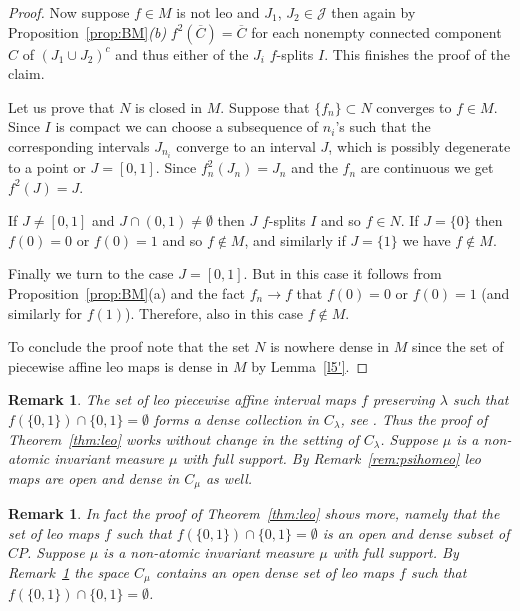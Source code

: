 \documentclass[12pt, a4paper]{amsart}
\newtheorem{remark}[theorem]{Remark}
\def\J{{\mathcal J}}
\newcommand{\?}{{\bf ???}}
\begin{document}
\begin{proof}
 Now suppose $f \in M$ is not leo and $J_1$, $J_2 \in \J$  then again by 
Proposition~\ref{prop:BM}{\it (b)}
$f^2(\overline{C}) = \overline{C}$ for each nonempty connected component $C$ of $(J_1 \cup J_2)^c$ and thus either of the $J_i$ $f$-splits $I$. This finishes the proof of the claim.

 Let us prove that $N$ is closed in $M$.  Suppose that $\{f_n\} \subset N$ converges to $f \in M$. Since $I$ is compact we can choose a subsequence of $n_i$'s such that the corresponding intervals $J_{n_i}$ converge to an interval $J$, which is  possibly degenerate to a point or $J = [0,1]$. Since 
$f_n^2(J_n) = J_n$
and the $f_n$ are continuous we get $f^2(J) = J$.

If $J\neq [0,1]$ and $J \cap (0,1) \ne \emptyset$ then $J$ $f$-splits $I$ and so $f \in N$.
If $J = \{0\}$
then $f(0) = 0 $ or $f(0) =1$ and so $f \not \in M$, and similarly if $J = \{1\}$ we have $f \not \in M$.

Finally we turn to the case $J = [0,1]$. But in this case it follows from Proposition~\ref{prop:BM}(a) and the fact $f_n\to f$ that $f(0)=0$ or $f(0)=1$ (and similarly for $f(1)$). Therefore, also in this case $f\notin M$.

To conclude the proof note that the set $N$ is nowhere dense in $M$ since the set of piecewise affine leo maps is dense in $M$ by Lemma~\ref{l5'}.
\end{proof}

\begin{remark}\label{rem:leolambda}
The set of leo piecewise affine interval maps $f$ preserving $\lambda$ such that $f(\{0,1\})\cap \{0,1\}=\emptyset$ forms a dense collection in $C_{\lambda}$, see \cite[Proposition 8]{BT}.
Thus the proof of Theorem~\ref{thm:leo} works without change in the setting of $C_{\lambda}$.
Suppose $\mu$ is a non-atomic invariant measure $\mu$ with full support.
By Remark~\ref{rem:psihomeo} leo maps are open and dense in $C_{\mu}$ as well. 
\end{remark}


\begin{remark}
In fact the proof of Theorem~\ref{thm:leo} shows more, namely that the set of leo maps $f$ such that $f(\{0,1\})\cap \{0,1\}=\emptyset$ is an open and dense subset of $CP$. Suppose $\mu$ is a non-atomic invariant measure $\mu$ with full support. By Remark~\ref{rem:leolambda} the space $C_{\mu}$ contains an open dense set of leo maps $f$ such that $f(\{0,1\})\cap \{0,1\}=\emptyset$.  
\end{remark}
\end{document}
